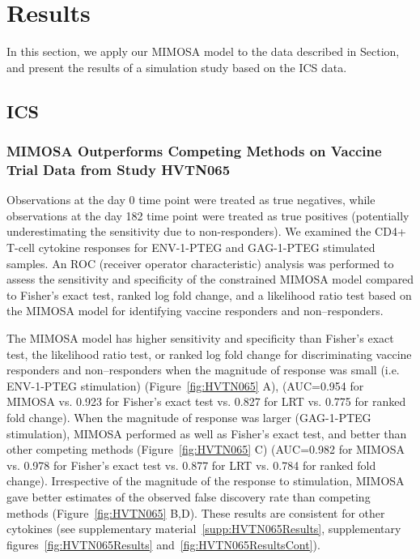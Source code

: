 \documentclass[11pt]{article}
\begin{document}
\section{Results}
In this section, we apply our MIMOSA model to the data described in Section, and present the results of a simulation study based on the ICS data.

\subsection{ICS}
\subsubsection*{MIMOSA Outperforms Competing Methods on Vaccine Trial Data from Study HVTN065}

Observations at the day 0 time point were treated as true negatives, while observations at the day 182 time point were treated as true positives (potentially underestimating the sensitivity due to non-responders). We examined the CD4+ T-cell cytokine responses for ENV-1-PTEG and GAG-1-PTEG stimulated samples. An ROC (receiver operator characteristic) analysis was performed to assess the sensitivity and specificity of the constrained MIMOSA model compared to Fisher's exact test, ranked log fold change, and a likelihood ratio test based on the MIMOSA model for identifying vaccine responders and non--responders. 

The MIMOSA model has higher sensitivity and specificity than Fisher's exact test, the likelihood ratio test, or ranked log fold change for discriminating vaccine responders and non--responders when the magnitude of response was small (i.e. ENV-1-PTEG stimulation) (Figure~\ref{fig:HVTN065} A),  (AUC=0.954 for MIMOSA vs. 0.923 for Fisher's exact test vs. 0.827 for LRT vs. 0.775 for ranked fold change). When the magnitude of response was larger (GAG-1-PTEG stimulation), MIMOSA performed as well as Fisher's exact test, and better than other competing methods (Figure~\ref{fig:HVTN065} C) (AUC=0.982 for MIMOSA vs. 0.978 for Fisher's exact test vs. 0.877 for LRT vs. 0.784 for ranked fold change). Irrespective of the magnitude of the response to stimulation, MIMOSA gave better estimates of the observed false discovery rate than competing methods (Figure~\ref{fig:HVTN065} B,D). These results are consistent for other cytokines (see supplementary material~\ref{supp:HVTN065Results}, supplementary figures~\ref{fig:HVTN065Results} and~\ref{fig:HVTN065ResultsCont}).
\end{document}
